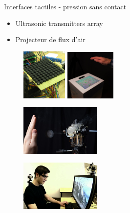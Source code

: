 \documentclass[compress, noflama]{beamer}
\begin{document}
\begin{frame}{Interfaces tactiles - pression sans contact}
\begin{multicols}{2}

\begin{itemize}
\item Ultrasonic transmitters array
\item Projecteur de flux d'air
\end{itemize}

\begin{figure}
\centering
\includegraphics[width=2.25cm]{images/ultrahaptics}
\includegraphics[width=2.5cm]{images/ultrahaptics_project_photo}
\caption{\cite{Alexander2011}}
\end{figure}


\begin{figure}
\centering
\includegraphics[width=4cm]{images/AIREALVortexRingFig}
\end{figure}
\vspace{-1.5cm}
\begin{figure}
\includegraphics[width=4cm]{images/aireal2}
\caption{\cite{Sodhi2013}}
\end{figure}

\end{multicols}
\end{frame}
\end{document}
